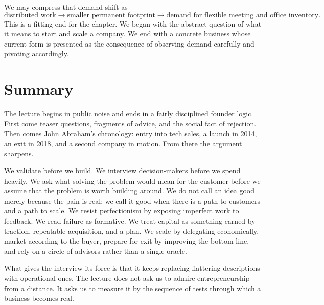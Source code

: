 We may compress that demand shift as
\begin{equation}
\text{distributed work}
\longrightarrow
\text{smaller permanent footprint}
\longrightarrow
\text{demand for flexible meeting and office inventory}.
\end{equation}
This is a fitting end for the chapter. We began with the abstract question of what it means to start and scale a company. We end with a concrete business whose current form is presented as the consequence of observing demand carefully and pivoting accordingly.

\section{Summary}

The lecture begins in public noise and ends in a fairly disciplined founder logic. First come teaser questions, fragments of advice, and the social fact of rejection. Then comes John Abraham's chronology: entry into tech sales, a launch in 2014, an exit in 2018, and a second company in motion. From there the argument sharpens.

We validate before we build. We interview decision-makers before we spend heavily. We ask what solving the problem would mean for the customer before we assume that the problem is worth building around. We do not call an idea good merely because the pain is real; we call it good when there is a path to customers and a path to scale. We resist perfectionism by exposing imperfect work to feedback. We read failure as formative. We treat capital as something earned by traction, repeatable acquisition, and a plan. We scale by delegating economically, market according to the buyer, prepare for exit by improving the bottom line, and rely on a circle of advisors rather than a single oracle.

What gives the interview its force is that it keeps replacing flattering descriptions with operational ones. The lecture does not ask us to admire entrepreneurship from a distance. It asks us to measure it by the sequence of tests through which a business becomes real.